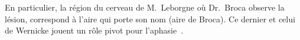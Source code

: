 
En particulier, la région du cerveau de M.~Leborgne où Dr.~Broca observe la lésion,
correspond à l'aire qui porte son nom (aire de Broca).
Ce dernier et celui de Wernicke jouent un rôle pivot pour l'aphasie~\cite{Hallowell_2017}.